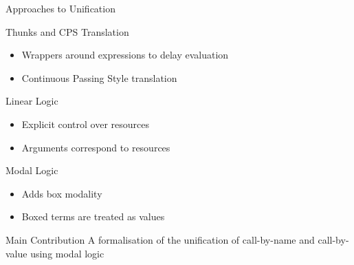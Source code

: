 \documentclass{beamer}
\theoremstyle{definition}
\begin{document}
  \begin{frame}{Approaches to Unification}

  \begin{block}{Thunks and CPS Translation}
    \begin{itemize}
      \item Wrappers around expressions to delay evaluation
      \item Continuous Passing Style translation
    \end{itemize}
    
  \end{block}

  \pause
  \begin{block}{Linear Logic}
    \begin{itemize}
      \item Explicit control over resources
      \item Arguments correspond to resources
    \end{itemize}
  \end{block}

  \pause
  \begin{block}{Modal Logic}
    \begin{itemize}
      \item Adds box modality
      \item Boxed terms are treated as values
    \end{itemize}
  \end{block}

  \end{frame}


  \begin{frame}{Main Contribution}
    \Large
    A formalisation of the unification of call-by-name and call-by-value using modal logic
  \end{frame}
\end{document}
